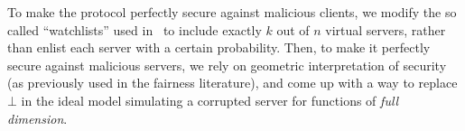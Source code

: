 \documentclass{llncs}
\newcommand{\OT}{\operatorname{OT}}
\newcommand{\bOT}[2]{#1\text{-out-of-}#2\text{ bit-}\OT}
\begin{document}
To make the protocol perfectly secure against malicious clients, we modify the so called ``watchlists'' used in~\cite{IKOPS11}  to include exactly $k$ out of $n$ virtual servers, rather than enlist each server with a certain probability. Then, to make it perfectly secure against malicious servers, we rely on geometric interpretation of security (as previously used in the fairness literature), and come up with a way to replace $\bot$ in the ideal model simulating a corrupted server for functions of \emph{full dimension}.



 
\end{document}
